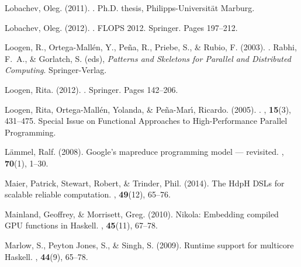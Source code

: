 \documentclass{jfp1}
\begin{document}
\begin{thebibliography}{}
Lobachev, Oleg. (2011).
.
\newblock Ph.D. thesis, Philipps-Universit{\"a}t Marburg.

Lobachev, Oleg. (2012).
.
\newblock FLOPS 2012.
\newblock Springer.
\newblock Pages  197--212.

Loogen, R., {Ortega-Mall\'{e}n}, Y., {Pe\~{n}a}, R., Priebe, S., \& Rubio, F.
  (2003).
.
 Rabhi, F.~A., \& Gorlatch, S. (eds), {\em
  {Patterns and Skeletons for Parallel and Distributed Computing}}.
\newblock Springer-Verlag.

Loogen, Rita. (2012).
.
\newblock Springer.
\newblock Pages  142--206.

Loogen, Rita, Ortega-Mall\'{e}n, Yolanda, \& {Pe\~{n}a-Mar\'{\i}}, Ricardo.
  (2005).
.
, {\bf 15}(3), 431--475.
\newblock Special Issue on Functional Approaches to High-Performance Parallel
  Programming.

Lämmel, Ralf. (2008).
\newblock Google’s mapreduce programming model — revisited.
, {\bf 70}(1), 1--30.

Maier, Patrick, Stewart, Robert, \& Trinder, Phil. (2014).
\newblock The {HdpH} {DSLs} for scalable reliable computation.
, {\bf 49}(12), 65--76.

Mainland, Geoffrey, \& Morrisett, Greg. (2010).
\newblock Nikola: Embedding compiled {GPU} functions in {Haskell}.
, {\bf 45}(11), 67--78.

Marlow, S., {Peyton Jones}, S., \& Singh, S. (2009).
\newblock Runtime support for multicore {Haskell}.
, {\bf 44}(9), 65--78.


\end{thebibliography}
\end{document}
